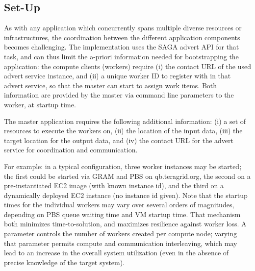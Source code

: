 \documentclass[3p,twocolumn]{elsarticle}
\begin{document}
\subsection{\sagamapreduce Set-Up}

As with any application which concurrently spans multiple diverse
resources or infrastructures, the coordination between the different
application components becomes challenging.  The \smr implementation
uses the SAGA advert API for that task, and can thus limit the a-priori
information needed for bootstrapping the application: the compute
clients (workers) require (i) the contact URL of the used advert
service instance, and (ii) a unique worker ID to register with in that
advert service, so that the master can start to assign work items.
Both information are provided by the master via command line
parameters to the worker, at startup time.

The master application requires the following additional information:
(i) a set of resources to execute the workers on, (ii) the
location of the input data, (iii) the target location for the output
data, and (iv) the contact URL for the advert service for
coordination and communication.

For example: in a typical configuration, three worker instances may
be started; the first could be started via GRAM and PBS on
qb.teragrid.org, the second on a pre-instantiated EC2 image
(with known instance id), and the third on a dynamically deployed
EC2 instance (no instance id given).  Note that the startup times for
the individual workers may vary over several orders of magnitudes,
depending on PBS queue waiting time and VM startup time.  
That mechanism both minimizes time-to-solution, and
maximizes resilience against worker loss.
%
%
A parameter controls the number of workers created per compute node;
varying that parameter permits compute and communication interleaving,
which may lead to an increase in the overall system utilization (even
in the absence of precise knowledge of the target system).
\end{document}
